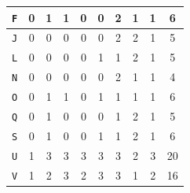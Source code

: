 \documentclass[submit]{ipsj}
\begin{document}
\begin{table}[t]
\begin{minipage}[t]{0.5\linewidth}
{\begin{tabular}{c|c|cccccccc}
\rowcolor{Green!30}%
\texttt{\large{F}}                   & 0                                           & \multicolumn{1}{c|}{1} & \multicolumn{1}{c|}{1} & \multicolumn{1}{c|}{0} & \multicolumn{1}{c|}{0} & \multicolumn{1}{c|}{2} & \multicolumn{1}{c|}{1} & \multicolumn{1}{c|}{1} & 6  \\ \hline
\texttt{\large{J}}                   & 0                                           & \multicolumn{1}{c|}{0} & \multicolumn{1}{c|}{0} & \multicolumn{1}{c|}{0} & \multicolumn{1}{c|}{0} & \multicolumn{1}{c|}{2} & \multicolumn{1}{c|}{2} & \multicolumn{1}{c|}{1} & 5  \\ \hline
\rowcolor{blue!30}%
\texttt{\large{L}}                   & 0                                           & \multicolumn{1}{c|}{0} & \multicolumn{1}{c|}{0} & \multicolumn{1}{c|}{0} & \multicolumn{1}{c|}{1} & \multicolumn{1}{c|}{1} & \multicolumn{1}{c|}{2} & \multicolumn{1}{c|}{1} & 5  \\ \hline
\rowcolor{blue!30}%
\texttt{\large{N}}                   & 0                                           & \multicolumn{1}{c|}{0} & \multicolumn{1}{c|}{0} & \multicolumn{1}{c|}{0} & \multicolumn{1}{c|}{0} & \multicolumn{1}{c|}{2} & \multicolumn{1}{c|}{1} & \multicolumn{1}{c|}{1} & 4  \\ \hline
\texttt{\large{O}}                   & 0                                           & \multicolumn{1}{c|}{1} & \multicolumn{1}{c|}{1} & \multicolumn{1}{c|}{0} & \multicolumn{1}{c|}{1} & \multicolumn{1}{c|}{1} & \multicolumn{1}{c|}{1} & \multicolumn{1}{c|}{1} & 6  \\ \hline
\rowcolor{blue!30}%
\texttt{\large{Q}}                   & 0                                           & \multicolumn{1}{c|}{1} & \multicolumn{1}{c|}{0} & \multicolumn{1}{c|}{0} & \multicolumn{1}{c|}{0} & \multicolumn{1}{c|}{1} & \multicolumn{1}{c|}{2} & \multicolumn{1}{c|}{1} & 5  \\ \hline
\texttt{\large{S}}                   & 0                                           & \multicolumn{1}{c|}{1} & \multicolumn{1}{c|}{0} & \multicolumn{1}{c|}{0} & \multicolumn{1}{c|}{1} & \multicolumn{1}{c|}{1} & \multicolumn{1}{c|}{2} & \multicolumn{1}{c|}{1} & 6  \\ \hline
\texttt{\large{U}}                   & 1                                           & \multicolumn{1}{c|}{3} & \multicolumn{1}{c|}{3} & \multicolumn{1}{c|}{3} & \multicolumn{1}{c|}{3} & \multicolumn{1}{c|}{3} & \multicolumn{1}{c|}{2} & \multicolumn{1}{c|}{3} & 20 \\ \hline
\texttt{\large{V}}                   & 1                                           & \multicolumn{1}{c|}{2} & \multicolumn{1}{c|}{3} & \multicolumn{1}{c|}{2} & \multicolumn{1}{c|}{3} & \multicolumn{1}{c|}{3} & \multicolumn{1}{c|}{1} & \multicolumn{1}{c|}{2} & 16 \\ \hline

\end{tabular}}
\end{minipage}
\end{table}
\end{document}
